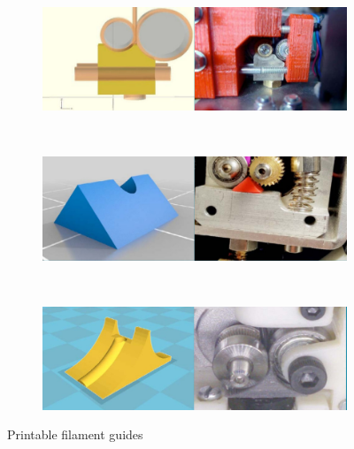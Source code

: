 \documentclass[11pt,a4paper]{article}
\begin{document}
\begin{figure}[H]
    \centering
    \begin{subfigure}[b]{0.5\textwidth}
        \includegraphics[width=\textwidth,cfbox=azul_marcos 4pt 0pt]{FOTOS/GUIA1}
    \end{subfigure}
    ~ %
    \begin{subfigure}[b]{0.5\textwidth}
        \includegraphics[width=\textwidth,cfbox=azul_marcos 4pt 0pt]{FOTOS/GUIA2}
    \end{subfigure}
    ~ %
    \begin{subfigure}[b]{0.5\textwidth}
        \includegraphics[width=\textwidth,cfbox=azul_marcos 4pt 0pt]{FOTOS/GUIA3}
    \end{subfigure}
    \caption*{Printable filament guides}
\end{figure}	
\end{document}
